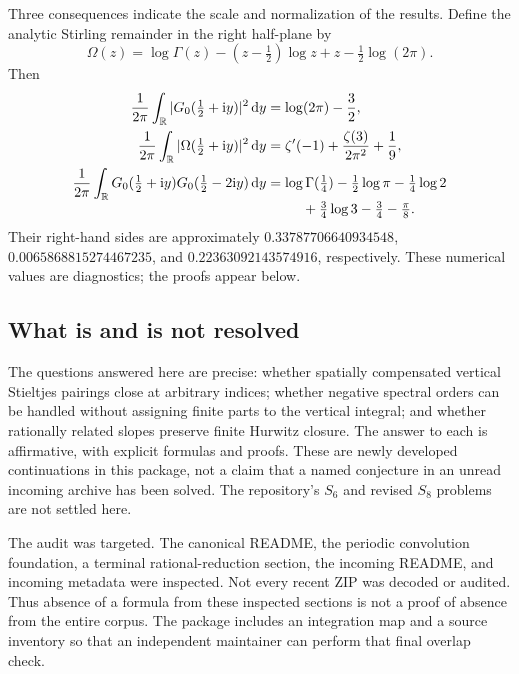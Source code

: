 Three consequences indicate the scale and normalization of the results.
Define the analytic Stirling remainder in the right half-plane by
\begin{equation}\label{eq:Omega-intro}
 \Omega(z)=\log\Gamma(z)-(z-\tfrac12)\log z+z-\tfrac12\log(2\pi).
\end{equation}
Then
\begin{align}
 \frac1{2\pi}\int_{\mathbb R}
   |G_0(\tfrac12+\mathrm i y)|^2\,\mathrm d y
   &=\log(2\pi)-\frac32,\label{eq:headline-digamma}\\
 \frac1{2\pi}\int_{\mathbb R}
   |\Omega(\tfrac12+\mathrm i y)|^2\,\mathrm d y
   &=\zeta'(-1)+\frac{\zeta(3)}{2\pi^2}+\frac19,
       \label{eq:headline-stirling}\\
 \frac1{2\pi}\int_{\mathbb R}
    G_0(\tfrac12+\mathrm i y)G_0(\tfrac12-2\mathrm i y)\,\mathrm d y
   &=\log\Gamma(\tfrac14)-\tfrac12\log\pi-\tfrac14\log2
       \notag\\[-1mm]
   &\hspace{9mm}+\tfrac34\log3-\tfrac34-\tfrac\pi8.
       \label{eq:headline-quarter}
\end{align}
Their right-hand sides are approximately $0.33787706640934548$,
$0.0065868815274467235$, and $0.22363092143574916$, respectively.
These numerical values are diagnostics; the proofs appear below.

\subsection{What is and is not resolved}
The questions answered here are precise: whether spatially compensated
vertical Stieltjes pairings close at arbitrary indices; whether negative
spectral orders can be handled without assigning finite parts to the
vertical integral; and whether rationally related slopes preserve finite
Hurwitz closure. The answer to each is affirmative, with explicit formulas
and proofs. These are newly developed continuations in this package, not a
claim that a named conjecture in an unread incoming archive has been solved.
The repository's $S_6$ and revised $S_8$ problems are not settled here.

The audit was targeted. The canonical README, the periodic convolution
foundation, a terminal rational-reduction section, the incoming README,
and incoming metadata were inspected. Not every recent ZIP was decoded or
audited. Thus absence of a formula from these inspected sections is not a
proof of absence from the entire corpus. The package includes an integration
map and a source inventory so that an independent maintainer can perform
that final overlap check.

